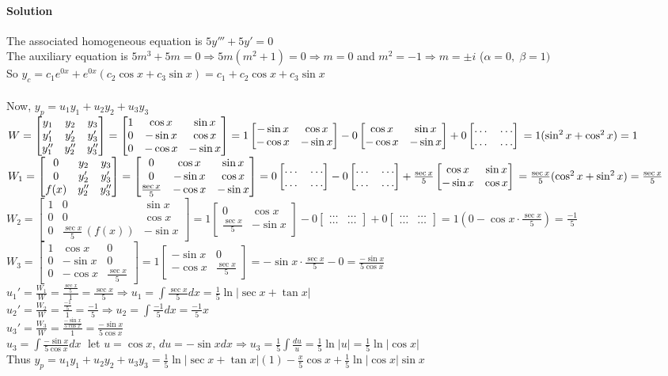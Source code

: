 \documentclass{article}
\newcommand{\mat}[4]{\begin{bmatrix} #1 & #2 \\ #3 & #4 \end{bmatrix}}
\newcommand{\mathree}[9]{\begin{bmatrix} #1 & #2 & #3 \\ #4 & #5 & #6 \\ #7 & #8 & #9 \end{bmatrix}}
\begin{document}
\paragraph{Solution}
The associated homogeneous equation is $5y'''+5y'=0$
\\The auxiliary equation is $5m^3+5m=0\Rightarrow5m(m^2+1)=0\Rightarrow m=0$ and $m^2=-1\Rightarrow m=\pm i$ ($\alpha=0,\;\beta=1)$
\\So $y_c=c_1e^{0x}+e^{0x}(c_2\cos x+c_3\sin x)=c_1+c_2\cos x+c_3\sin x$
\\\\Now, $y_p=u_1y_1+u_2y_2+u_3y_3$
\\$W=\mathree{y_1}{y_2}{y_3}{y_1'}{y_2'}{y_3'}{y_1''}{y_2''}{y_3''}=\mathree{1}{\cos x}{\sin x}{0}{-\sin x}{\cos x}{0}{-\cos x}{-\sin x}
=1\mat{-\sin x}{\cos x}{-\cos x}{-\sin x}-0\mat{\cos x}{\sin x}{-\cos x}{-\sin x}+0\mat{\dots}{\dots}{\dots}{\dots}\\=1(\sin^2x+\cos^2x)=1$
\\$W_1=\mathree{0}{y_2}{y_3}{0}{y_2'}{y_3'}{f(x)}{y_2''}{y_3''}=\mathree{0}{\cos x}{\sin x}{0}{-\sin x}{\cos x}{\frac{\sec x}{5}}{-\cos x}{-\sin x}
=0\mat{\dots}{\dots}{\dots}{\dots}-0\mat{\dots}{\dots}{\dots}{\dots}+\frac{\sec x}{5}\mat{\cos x}{\sin x}{-\sin x}{\cos x}
\\=\frac{\sec x}{5}(\cos^2x+\sin^2x)=\frac{\sec x}{5}$
\\$W_2=\mathree{1}{0}{\sin x}{0}{0}{\cos x}{0}{\frac{\sec x}{5}\,(f(x))}{-\sin x}
=1\mat{0}{\cos x}{\frac{\sec x}{5}}{-\sin x}-0\mat{\dots}{\dots}{\dots}{\dots}+0\mat{\dots}{\dots}{\dots}{\dots}
=1(0-\cos x\cdot\frac{\sec x}{5})=\frac{-1}{5}$
\\$W_3=\mathree{1}{\cos x}{0}{0}{-\sin x}{0}{0}{-\cos x}{\frac{\sec x}{5}}=1\mat{-\sin x}{0}{-\cos x}{\frac{\sec x}{5}}=-\sin x\cdot\frac{\sec x}{5}-0=\frac{-\sin x}{5\cos x}$
\\$u_1'=\frac{W_1}{W}=\frac{\frac{\sec x}{5}}{1}=\frac{\sec x}{5}\Rightarrow u_1=\int\frac{\sec x}{5}dx=\frac{1}{5}\ln|\sec x+\tan x|$
\\$u_2'=\frac{W_2}{W}=\frac{\frac{-1}{5}}{1}=\frac{-1}{5}\Rightarrow u_2=\int\frac{-1}{5}dx=\frac{-1}{5}x$
\\$u_3'=\frac{W_3}{W}=\frac{\frac{-\sin x}{5\cos x}}{1}=\frac{-\sin x}{5\cos x}$
\\$u_3=\int\frac{-\sin x}{5\cos x}dx\;$ let $u=\cos x$, $du=-\sin xdx\Rightarrow u_3=\frac{1}{5}\int\frac{du}{u}=\frac{1}{5}\ln|u|=\frac{1}{5}\ln|\cos x|$
\\Thus $y_p=u_1y_1+u_2y_2+u_3y_3=\frac{1}{5}\ln|\sec x+\tan x|(1)-\frac{x}{5}\cos x+\frac{1}{5}\ln|\cos x|\sin x$
\end{document}
